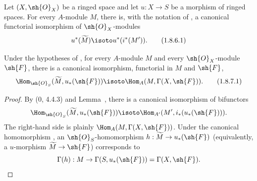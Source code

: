 \begin{corollary}[1.8.6]
\label{ega2:addendum:I.1.8.6}
Let $(X,\sh{O}_X)$ be a ringed space and let $u:X\to S$ be a morphism
of
ringed spaces. For every $A$-module $M$, there is, with the notation of
, a canonical functorial isomorphism of
$\sh{O}_X$-modules
\begin{equation}
\label{ega2:addendum:I.1.8.6.1}
  u^*(\widetilde M)\isoto u^*(i^*(M')).
\tag{1.8.6.1}
\end{equation}
\end{corollary}

\begin{corollary}[1.8.7]
\label{ega2:addendum:I.1.8.7}
Under the hypotheses of , for every $A$-module $M$ and
every $\sh{O}_X$-module $\sh{F}$, there is a canonical isomorphism,
functorial in $M$ and $\sh{F}$,
\begin{equation}
\label{ega2:addendum:I.1.8.7.1}
  \Hom_{\sh{O}_S}(\widetilde M,u_*(\sh{F}))
  \isoto\Hom_A(M,\Gamma(X,\sh{F})).
\tag{1.8.7.1}
\end{equation}
\end{corollary}

\begin{proof}
By (0, 4.4.3) and Lemma~, there is a canonical
isomorphism of bifunctors
\[
  \Hom_{\sh{O}_S}(\widetilde M,u_*(\sh{F}))
  \isoto\Hom_{A'}(M',i_*(u_*(\sh{F}))).
\]
The right-hand side is plainly $\Hom_A(M,\Gamma(X,\sh{F}))$.  Under
the canonical homomorphism , an
$\sh{O}_S$-homomorphism
$h:\widetilde M\to u_*(\sh{F})$ (equivalently, a $u$-morphism
$\widetilde M\to\sh{F}$) corresponds to
\[
  \Gamma(h):M\to\Gamma(S,u_*(\sh{F}))=\Gamma(X,\sh{F}).
\]
\end{proof}

